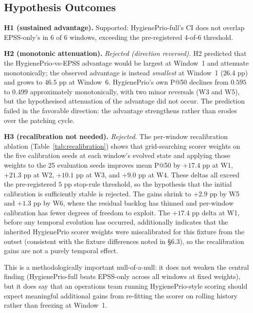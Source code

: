 \subsection{Hypothesis Outcomes}

\textbf{H1 (sustained advantage).} Supported: HygienePrio-full's CI does not overlap EPSS-only's in 6 of 6 windows, exceeding the pre-registered 4-of-6 threshold.

\textbf{H2 (monotonic attenuation).} \textit{Rejected (direction reversed).} H2 predicted that the HygienePrio-vs-EPSS advantage would be largest at Window~1 and attenuate monotonically; the observed advantage is instead \textit{smallest} at Window~1 ($26.4$ pp) and grows to $46.5$ pp at Window~6. HygienePrio's own P@50 declines from $0.595$ to $0.499$ approximately monotonically, with two minor reversals (W3 and W5), but the hypothesised attenuation of the advantage did not occur. The prediction failed in the favorable direction: the advantage strengthens rather than erodes over the patching cycle.

\textbf{H3 (recalibration not needed).} \textit{Rejected.} The per-window recalibration ablation (Table~\ref{tab:recalibration}) shows that grid-searching scorer weights on the five calibration seeds at each window's evolved state and applying those weights to the 25 evaluation seeds improves mean P@50 by $+17.4$ pp at W1, $+21.3$ pp at W2, $+10.1$ pp at W3, and $+9.0$ pp at W4. These deltas all exceed the pre-registered $5$ pp stop-rule threshold, so the hypothesis that the initial calibration is sufficiently stable is rejected. The gains shrink to $+2.9$ pp by W5 and $+1.3$ pp by W6, where the residual backlog has thinned and per-window calibration has fewer degrees of freedom to exploit. The $+17.4$ pp delta at W1, before any temporal evolution has occurred, additionally indicates that the inherited HygienePrio scorer weights were miscalibrated for this fixture from the outset (consistent with the fixture differences noted in \S6.3), so the recalibration gains are not a purely temporal effect.



This is a methodologically important null-of-a-null: it does not weaken the central finding (HygienePrio-full beats EPSS-only across all windows at fixed weights), but it does say that an operations team running HygienePrio-style scoring should expect meaningful additional gains from re-fitting the scorer on rolling history rather than freezing at Window~1.
